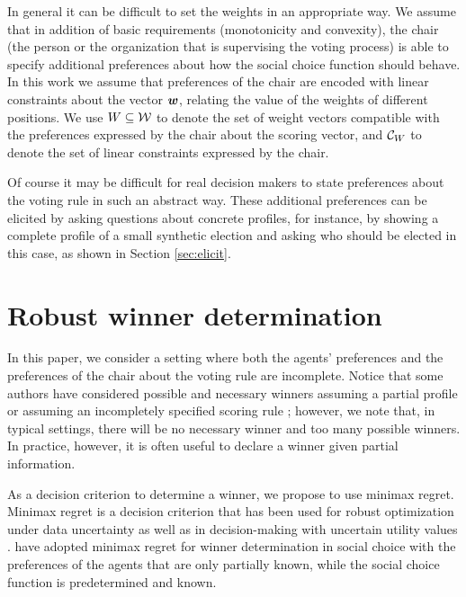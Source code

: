 In general it can be difficult to set the weights in an appropriate way.
We assume that in addition of basic requirements (monotonicity and convexity), the chair (the person or the organization that is supervising the voting process) is able to specify additional preferences about how the social choice function should behave.
In this work we assume that preferences of the chair are encoded with linear constraints about the vector $\bm{w}$, relating the value of the weights of different positions.
We use $W \subseteq \mathcal{W}$ to denote the set of weight vectors compatible with the preferences expressed by the chair about the scoring vector, and $\mathcal{C}_W$ to denote the set of linear constraints expressed by the chair.

Of course it may be difficult for real decision makers to state preferences about the voting rule in such an abstract way.
These additional preferences can be elicited by asking questions about concrete profiles, for instance, by showing a complete profile of a small synthetic election and asking who should be elected in this case, as shown in Section \ref{sec:elicit}.

\section[Minimax regret under partial profile and weight information]{
Robust winner determination}
\label{sec:mmr}

In this paper, we consider a setting where both the agents' preferences and the preferences of the chair about the voting rule are incomplete.
Notice that some authors have considered possible and necessary winners assuming a partial profile  \citep{Xia2008} or assuming an incompletely specified scoring rule \citep{Viappiani2018};
however, we note that, in typical settings, there will be no necessary winner and too many possible winners.
In practice, however, it is often useful to declare a winner given partial information.

As a decision criterion to determine a winner, we propose to use minimax regret. 
Minimax regret \citep{Savage1954} is a decision criterion that has been used for robust optimization under data uncertainty \citep{Kouvelis1997} as well as in decision-making with uncertain utility values \citep{Salo2001,Boutilier2006}.
\citet{Lu2011} have adopted minimax regret for winner determination in social choice with
the preferences of the agents that are only partially known, while the social choice function is predetermined and known.

